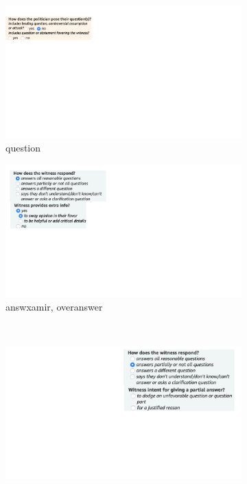 \begin{figure}
\centering
\begin{subfigure}{.45\textwidth}
  \centering
  \includegraphics[width=1\linewidth]{plots/subj_amt_screenshots_question.pdf}
  \vspace{3.5em}
  \caption{question}
\end{subfigure}%
\begin{subfigure}{.45\textwidth}
  \centering
  \includegraphics[width=1\linewidth]{plots/subj_amt_screenshots_overanswer.pdf}
  \caption{answxamir, overanswer}
\end{subfigure}\\
\begin{subfigure}{.34\textwidth}
  \centering
  \includegraphics[width=1\linewidth]{plots/subj_amt_screenshots_response2.pdf}

\end{subfigure}
\end{figure}
